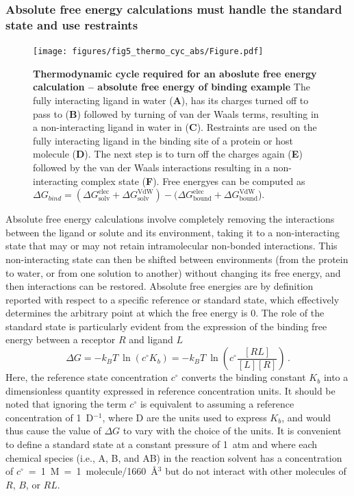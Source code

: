 \documentclass[9pt,bestpractices]{livecoms}
\begin{document}
\subsubsection{Absolute free energy calculations must handle the standard state and use restraints}
\label{sec:standardstate-restraints}
%
\begin{figure}
    \texttt{[image: figures/fig5\_thermo\_cyc\_abs/Figure.pdf]}
    \caption{\textbf{Thermodynamic cycle required for an aboslute free energy calculation -- absolute free energy of binding example} The fully interacting ligand in water (\textbf{A}), has its charges turned off to pass to (\textbf{B}) followed by turning of van der Waals terms, resulting in a non-interacting ligand in water in (\textbf{C}). Restraints are used on the fully interacting ligand in the binding site of a protein or host molecule (\textbf{D}). The next step is to turn off the charges again (\textbf{E}) followed by the van der Waals interactions resulting in a non-interacting complex state (\textbf{F}). Free energyes can be computed as $\Delta G_{bind} = (\Delta G^{\mathrm{elec}}_{\mathrm{solv}}+ \Delta G^{\mathrm{VdW}}_{\mathrm{solv}})-(\Delta G^{\mathrm{elec}}_{\mathrm{bound}}+ \Delta G^{\mathrm{VdW}}_{\mathrm{bound}}$).
    }
    \label{fig:fig_absolute_thermodynamic_cycle}
\end{figure}
%
Absolute free energy calculations involve completely removing the interactions between the ligand or solute and its environment, taking it to a non-interacting state that may or may not retain intramolecular non-bonded interactions.
This non-interacting state can then be shifted between environments (from the protein to water, or from one solution to another) without changing its free energy, and then interactions can be restored.
%
Absolute free energies are by definition  reported with respect to a specific reference or standard state, which effectively determines the arbitrary point at which the free energy is 0.
The role of the standard state is particularly evident from the expression of the binding free energy between a receptor $R$ and ligand $L$
\begin{equation} \label{eq:DGfromKAB}
    \Delta G = -k_BT ~ \ln \left( c^{\circ} K_b \right)  = -k_BT ~ \ln\left( c^{\circ} \frac{[RL]}{[L][R]} \right) \, .
\end{equation}
Here, the reference state concentration $c^{\circ}$ converts the binding constant $K_b$ into a dimensionless quantity expressed in reference concentration units.
It should be noted that ignoring the term $c^{\circ}$ is equivalent to assuming a reference concentration of 1~D$^{-1}$, where D are the units used to express $K_b$, and would thus cause the value of $\Delta G$ to vary with the choice of the units.
It is convenient to define a standard state at a constant pressure of 1~atm and where each chemical species (i.e., A, B, and AB) in the reaction solvent has a concentration of $c^{\circ}$~=~1~M~=~1~molecule/1660~\r{A}$^3$ but do not interact with other molecules of $R$, $B$, or $RL$.
%
\end{document}
